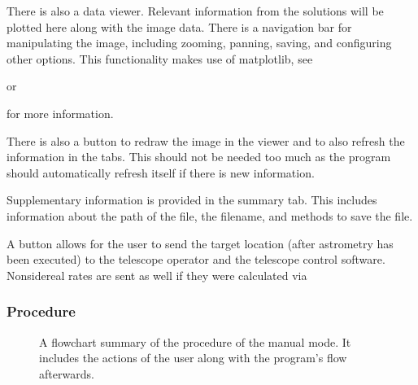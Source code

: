 \documentclass[letterpaper,11pt,english]{sphinxmanual}
\begin{document}
\sphinxAtStartPar
There is also a data viewer. Relevant information from the solutions will be
plotted here along with the image data. There is a navigation bar for
manipulating the image, including zooming, panning, saving, and configuring
other options. This functionality makes use of matplotlib, see
%
\begin{footnote}[4]\sphinxAtStartFootnote
{}
%
\end{footnote}
or %
\begin{footnote}[5]\sphinxAtStartFootnote
{}
%
\end{footnote}
for more information.

\sphinxAtStartPar
There is also a  button to redraw the image in the
viewer and to also refresh the information in the tabs. This should not be
needed too much as the program should automatically refresh itself if there
is new information.

\sphinxAtStartPar
Supplementary information is provided in the summary tab. This includes
information about the path of the file, the filename, and methods to save the
file.

\sphinxAtStartPar
A  button allows for the user to send the target
location (after astrometry has been executed) to the telescope operator and
the telescope control software. Non\sphinxhyphen{}sidereal rates are sent as well if they
were calculated via


\subsubsection{Procedure}
\label{\detokenize{user/manual_mode:procedure}}
\begin{figure}[H]
\centering
\capstart

\noindent{}
\caption{A flowchart summary of the procedure of the manual mode. It includes
the actions of the user along with the program’s flow afterwards.}\label{\detokenize{user/manual_mode:id3}}\label{\detokenize{user/manual_mode:figure-manual-mode-flowchart}}\end{figure}
\end{document}
